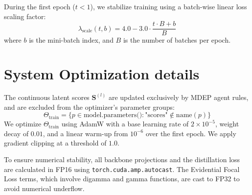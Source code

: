 \documentclass[11pt]{article}
\begin{document}
During the first epoch ($t < 1$), we stabilize training using a batch-wise linear loss scaling factor:
\begin{equation}
    \lambda_{\text{scale}}(t, b) = 4.0 - 3.0 \cdot \frac{t \cdot B + b}{B}
\end{equation}
where $b$ is the mini-batch index, and $B$ is the number of batches per epoch.

\section{System Optimization details}\label{sec:system}

The continuous latent scores $\bm{S}^{(l)}$ are updated exclusively by MDEP agent rules, and are excluded from the optimizer's parameter groups:
\begin{equation}
    \Theta_{\text{train}} = \{p \in \text{model.parameters()} : \text{"scores"} \notin \text{name}(p)\}
\end{equation}
We optimize $\Theta_{\text{train}} $ using AdamW with a base learning rate of $2 \times 10^{-5}$, weight decay of $0.01$, and a linear warm-up from $10^{-6}$ over the first epoch. We apply gradient clipping at a threshold of $1.0$.

To ensure numerical stability, all backbone projections and the distillation loss are calculated in FP16 using \texttt{torch.cuda.amp.autocast}. The Evidential Focal Loss terms, which involve digamma and gamma functions, are cast to FP32 to avoid numerical underflow.
\end{document}
